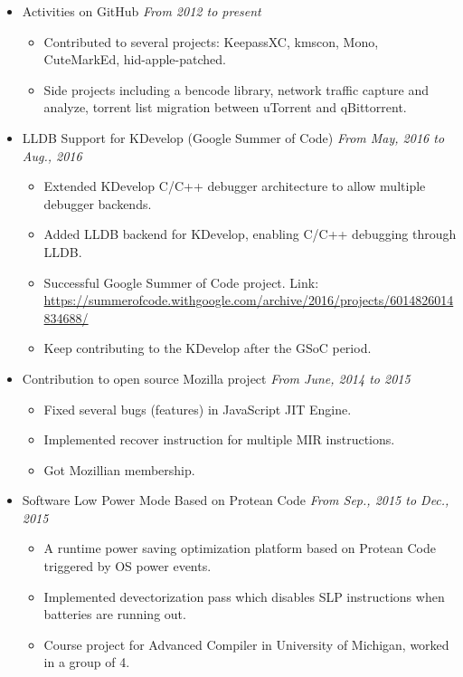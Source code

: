 \documentclass[letterpaper,11pt]{article}
\begin{document}
\begin{itemize}
    \item Activities on GitHub \hfill \textit{From 2012 to present}
    \begin{itemize}
        \item Contributed to several projects: KeepassXC, kmscon, Mono, CuteMarkEd, hid-apple-patched.
        \item Side projects including a bencode library, network traffic capture and analyze, torrent list migration between uTorrent and qBittorrent.
    \end{itemize}

    \item LLDB Support for KDevelop (Google Summer of Code) \hfill \textit{From May, 2016 to Aug., 2016}
    \begin{itemize}
        \item Extended KDevelop C/C++ debugger architecture to allow multiple debugger backends.
        \item Added LLDB backend for KDevelop, enabling C/C++ debugging through LLDB.
        \item Successful Google Summer of Code project. Link:
\url{https://summerofcode.withgoogle.com/archive/2016/projects/6014826014834688/}
        \item Keep contributing to the KDevelop after the GSoC period.
    \end{itemize}

    \item Contribution to open source Mozilla project \hfill \textit{From June, 2014 to 2015}
    \begin{itemize}
        \item Fixed several bugs (features) in JavaScript JIT Engine.
        \item Implemented recover instruction for multiple MIR instructions.
        \item Got Mozillian membership.
    \end{itemize}

    \item Software Low Power Mode Based on Protean Code \hfill \textit{From Sep., 2015 to Dec., 2015}
    \begin{itemize}
        \item A runtime power saving optimization platform based on Protean Code triggered by OS power events.
        \item Implemented devectorization pass which disables SLP instructions when batteries are running out.
        \item Course project for Advanced Compiler in University of Michigan, worked in a group of 4.
    \end{itemize}


\end{itemize}
\end{document}
